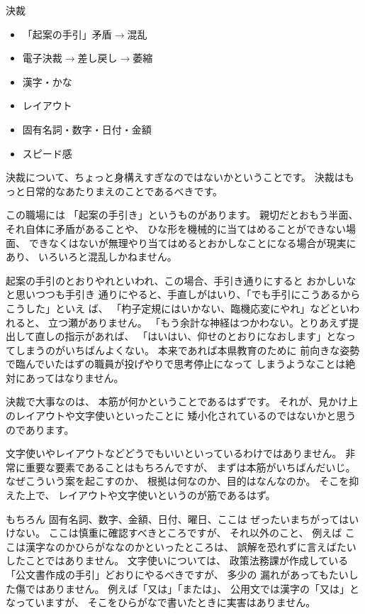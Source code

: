 \documentclass[uplatex,jis2004,dvipdfmx,12pt]{jsarticle}
\begin{document}
決裁
       \begin{itemize}
	\item 「起案の手引」矛盾$\longrightarrow${}混乱
	\item 電子決裁$\longrightarrow${}差し戻し$\longrightarrow${}萎縮
	\item 漢字・かな
	\item レイアウト
	\item 固有名詞・数字・日付・金額
	\item スピード感
   \end{itemize}

決裁について、ちょっと身構えすぎなのではないかということです。
決裁はもっと日常的なあたりまえのことであるべきです。


この職場には
「起案の手引き」というものがあります。
親切だとおもう半面、それ自体に矛盾があることや、
ひな形を機械的に当てはめることができない場面、
できなくはないが無理やり当てはめるとおかしなことになる場合が現実にあり、
いろいろと混乱しかねません。

起案の手引のとおりやれといわれ、この場合、手引き通りにすると
おかしいなと思いつつも手引き
通りにやると、手直しがはいり、「でも手引にこうあるからこうした」といえ
ば、
「杓子定規にはいかない、臨機応変にやれ」などといわれると、
立つ瀬がありません。
「もう余計な神経はつかわない。とりあえず提出して直しの指示があれば、
「はいはい、仰せのとおりになおします」となってしまうのがいちばんよくない。
本来であれば本県教育のために
前向きな姿勢で臨んでいたはずの職員が投げやりで思考停止になって
しまうようなことは絶対にあってはなりません。

決裁で大事なのは、
本筋が何かということであるはずです。
それが、見かけ上のレイアウトや文字使いといったことに
矮小化されているのではないかと思うのであります。

文字使いやレイアウトなどどうでもいいといっているわけではありません。
非常に重要な要素であることはもちろんですが、
まずは本筋がいちばんだいじ。
なぜこういう案を起こすのか、
根拠は何なのか、目的はなんなのか。
そこを抑えた上で、
レイアウトや文字使いというのが筋であるはず。

もちろん
固有名詞、数字、金額、日付、曜日、ここは
ぜったいまちがってはいけない。
ここは慎重に確認すべきところですが、
それ以外のこと、
例えば
ここは漢字なのかひらがななのかといったところは、
誤解を恐れずに言えばたいしたことではありません。
文字使いについては、
政策法務課が作成している「公文書作成の手引」どおりにやるべきですが、
多少の
漏れがあってもたいした傷ではありません。
例えば「又は」「または」、
公用文では漢字の「又は」となっていますが、
そこをひらがなで書いたときに実害はありません。
\end{document}
